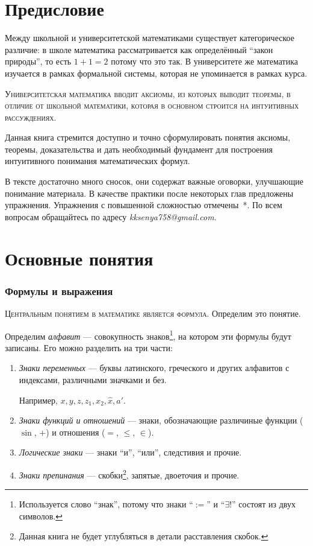 \part{Предисловие}

Между школьной и университетской математиками существует категорическое
различие: в школе математика рассматривается как определённый ``закон природы'',
то есть $1+1=2$ потому что это так. В университете же математика изучается
в рамках формальной системы, которая не упоминается в рамках курса.

\textsc{Университетская математика вводит аксиомы, из которых выводит теоремы,
	в отличие от школьной математики, которая
	в основном строится на интуитивных рассуждениях.}

Данная книга стремится доступно и точно сформулировать понятия аксиомы,
теоремы, доказательства и дать необходимый фундамент для построения
интуитивного понимания математических формул.

В тексте достаточно много сносок, они содержат важные оговорки,
улучшающие понимание материала. В качестве практики
после некоторых глав предложены упражнения. Упражнения с повышенной сложностью
отмечены~*.
По всем вопросам обращайтесь по адресу {\sl kksenya758@gmail.com}.

\part{Основные понятия}

\section{Формулы и выражения}

\textsc{Центральным понятием в математике является формула.}
Определим это понятие.

Определим {\it алфавит} --- совокупность знаков\footnote{
	Используется слово ``знак'', потому что знаки ``$:=$'' и ``$\exists!$''
	состоят из двух символов.
}, на котором эти
формулы будут записаны. Его можно разделить на три части:
\begin{enumerate}
	\item{}{\it Знаки переменных} --- буквы латинского,
	греческого и других алфавитов с индексами, различными значками и без.

	Например, $x,y,z,z_1,x_2,\hat x,a'$.

	\item{}{\it Знаки функций и отношений} --- знаки, обозначающие
	различиные функции ($\sin$, $+$) и отношения ($=$, $\leq$, $\in$).

	\item{}{\it Логические знаки} --- знаки ``и'', ``или'', следстивия и прочие.

	\item{}{\it Знаки препинания} --- скобки\footnote{
		Данная книга не будет углубляться в детали расставления скобок.
	}, запятые, двоеточия и прочие.
\end{enumerate}

